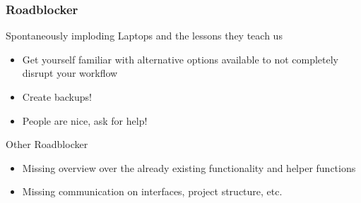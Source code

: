\begin{frame}
	\frametitle{Roadblocker}
	\Large
	Spontaneously imploding Laptops and the lessons they teach us
	\large
	\begin{itemize}
		\item Get yourself familiar with alternative options available to not completely disrupt your workflow
		\item Create backups!
		\item People are nice, ask for help!
	\end{itemize}

	\Large
	Other Roadblocker
	\large
	\begin{itemize}
		\item<1->  Missing overview over the already existing functionality and helper functions
		\item<2->  Missing communication on interfaces, project structure, etc.
	\end{itemize}
	
\end{frame}




